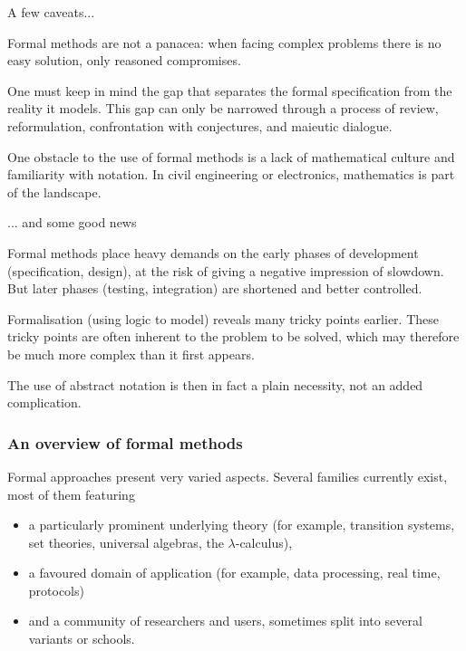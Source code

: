 \documentclass[compress,dvipdfmx]{beamer}
\begin{document}
%
\begin{frame}{A few caveats...}

  Formal methods are not a panacea: when facing complex problems there
  is no easy solution, only reasoned compromises.

  \bigskip

  One must keep in mind the gap that separates the formal
  specification from the reality it models. This gap can only be
  narrowed through a process of review, reformulation, confrontation
  with conjectures, and maieutic dialogue.

  \bigskip

  One obstacle to the use of formal methods is a lack of mathematical
  culture and familiarity with notation. In civil engineering or
  electronics, mathematics is part of the landscape.

\end{frame}

%
\begin{frame}{... and some good news}

  Formal methods place heavy demands on the early phases of
  development (specification, design), at the risk of giving a
  negative impression of slowdown. But later phases (testing,
  integration) are shortened and better controlled.

  \bigskip

  Formalisation (using logic to model) reveals many tricky points
  earlier. These tricky points are often inherent to the problem to be
  solved, which may therefore be much more complex than it first
  appears.

  \bigskip

  The use of abstract notation is then in fact a plain necessity, not
  an added complication.

\end{frame}

%
\begin{frame}
\frametitle{An overview of formal methods}

Formal approaches present very varied aspects. Several families
currently exist, most of them featuring

\begin{itemize}

  \item a particularly prominent underlying theory (for example,
  transition systems, set theories, universal algebras, the
  $\lambda$-calculus),

  \item a favoured domain of application (for example, data
  processing, real time, protocols)

  \item and a community of researchers and users, sometimes split
  into several variants or schools.

\end{itemize}

\end{frame}
\end{document}
